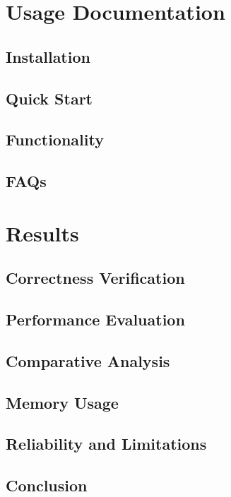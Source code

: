 \documentclass[12pt,a4paper]{article}
\begin{document}
%
%
\section{Usage Documentation}

\subsection{Installation}

\subsection{Quick Start}

\subsection{Functionality}

\subsection{FAQs}

%
%
\section{Results}

\subsection{Correctness Verification}

\subsection{Performance Evaluation}

\subsection{Comparative Analysis}

\subsection{Memory Usage}

\subsection{Reliability and Limitations}

\subsection{Conclusion}
\end{document}
